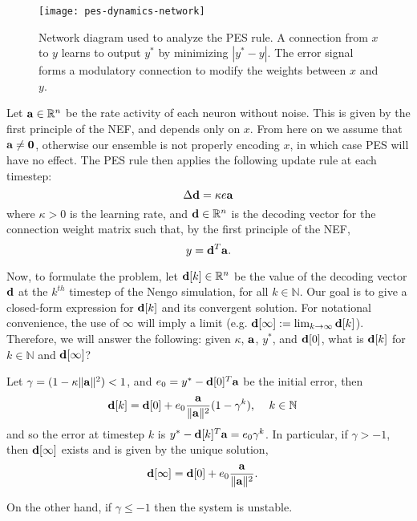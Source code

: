 \begin{figure}
\centering
\texttt{[image: pes-dynamics-network]}
\caption{\label{fig:pes-dynamics-network} Network diagram used to analyze the PES rule. A connection from $x$ to $y$ learns to output $y^*$ by minimizing $|y^* - y|$. The error signal forms a modulatory connection to modify the weights between $x$ and $y$.}
\end{figure}

Let $\mathbf{a} \in \mathbb{R}^n$ be the rate activity of each neuron without noise. This is given by the first principle of the NEF, and depends only on $x$. From here on we assume that $\mathbf{a} \ne \mathbf{0}$, otherwise our ensemble is not properly encoding $x$, in which case PES will have no effect. The PES rule then applies the following update rule at each timestep:
\begin{equation}
\label{eq:pes}
\Delta{\mathbf{d}} = \kappa e \mathbf{a}
\end{equation}
where $\kappa > 0$ is the learning rate, and $\mathbf{d} \in \mathbb{R}^n$ is the decoding vector for the connection weight matrix such that, by the first principle of the NEF,
\begin{equation}
\label{eq:decoding}
y = \mathbf{d}^T \mathbf{a} .
\end{equation}

Now, to formulate the problem, let $\mathbf{d}[k] \in \mathbb{R}^n$ be the value of the decoding vector $\mathbf{d}$ at the $k^{th}$ timestep of the Nengo simulation, for all $k \in \mathbb{N}$. Our goal is to give a closed-form expression for $\mathbf{d}[k]$ and its convergent solution. For notational convenience, the use of $\infty$ will imply a limit (e.g. $\mathbf{d}[\infty] := \lim_{k \rightarrow \infty} \mathbf{d}[k]$). Therefore, we will answer the following: given $\kappa$, $\mathbf{a}$, $y^*$, and $\mathbf{d}[0]$, what is $\mathbf{d}[k]$ for $k \in \mathbb{N}$ and $\mathbf{d}[\infty]$?

\begin{theorem}
\label{thm:pes-dynamics}

Let $\gamma = (1 - \kappa \|\mathbf{a}\|^2) < 1$, and $e_0 = y^* - \mathbf{d}[0]^T \mathbf{a}$ be the initial error, then
\begin{align}
\label{eq:dk}
\mathbf{d}[k] &= \mathbf{d}[0] + e_0\frac{\mathbf{a}}{\|\mathbf{a}\|^2} (1 - \gamma^k)\text{, \quad $k \in \mathbb{N}$}
\end{align}
and so the error at timestep $k$ is $y^* - \mathbf{d}[k]^T \mathbf{a} = e_0\gamma^k$. In particular, if $\gamma > - 1$, then $\mathbf{d}[\infty]$ exists and is given by the unique solution,
\begin{align}
\label{eq:dinf}
\mathbf{d}[\infty] &= \mathbf{d}[0] + e_0\frac{\mathbf{a}}{\|\mathbf{a}\|^2} .
\end{align}

On the other hand, if $\gamma \le -1$ then the system is unstable.
\end{theorem}

